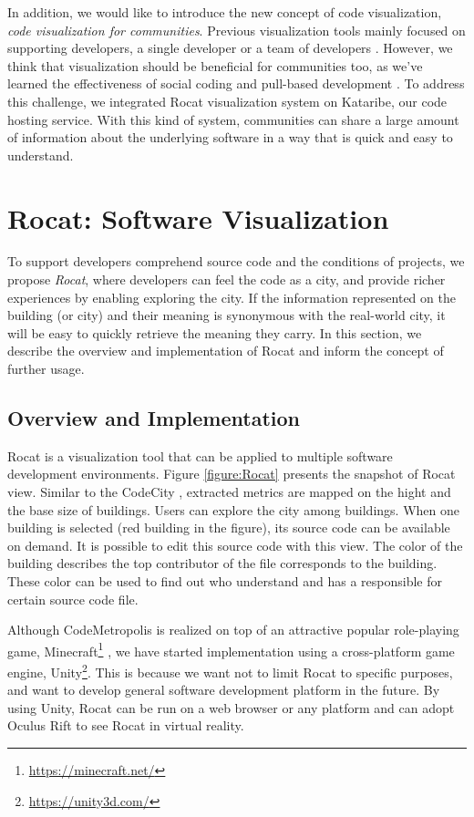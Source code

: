 \documentclass[conference]{IEEEtran}
\newcommand{\figref}[1]{Figure \ref{#1}}
\begin{document}
In addition, we would like to introduce the new concept of code visualization, \textit{code visualization for communities}.
Previous visualization tools mainly focused on supporting developers, a single developer \cite{Wettel:2011:SSC:1985793.1985868} or a team of developers \cite{6648194}.
However, we think that visualization should be beneficial for communities too, as we've learned the effectiveness of social coding \cite{Dabbish:2012:SCG:2145204.2145396} and pull-based development \cite{Gousios:2014:ESP:2568225.2568260}.
To address this challenge, we integrated Rocat visualization system on Kataribe,  our code hosting service.
With this kind of system, communities can share a large amount of information about the underlying software in a way that is quick and easy to understand.

\section{Rocat: Software Visualization}
To support developers comprehend source code and the conditions of projects, we propose \textit{Rocat}, where developers can feel the code as a city, and provide richer experiences by enabling exploring the city.
If the information represented on the building (or city) and their meaning is synonymous with the real-world city, it will be easy to quickly retrieve the meaning they carry.
In this section, we describe the overview and implementation of Rocat and inform the concept of further usage.

\subsection{Overview and Implementation}
Rocat is a visualization tool that can be applied to multiple software development environments.
\figref{figure:Rocat} presents the snapshot of Rocat view.
Similar to the CodeCity \cite{Wettel:2011:SSC:1985793.1985868}, extracted metrics are mapped on the hight and the base size of buildings.
Users can explore the city among buildings.
When one building is selected (red building in the figure), its source code can be available on demand.
It is possible to edit this source code with this view.
The color of the building describes the top contributor of the file corresponds to the building.
These color can be used to find out who understand and has a responsible for certain source code file.

Although CodeMetropolis is realized on top of an attractive popular role-playing game, Minecraft\footnote{\url{https://minecraft.net/}} \cite{6648194}, we have started implementation using a cross-platform game engine, Unity\footnote{\url{https://unity3d.com/}}.
This is because we want not to limit Rocat to specific purposes, and want to develop general software development platform in the future.
By using Unity, Rocat can be run on a web browser or any platform and can adopt Oculus Rift to see Rocat in virtual reality.
\end{document}
